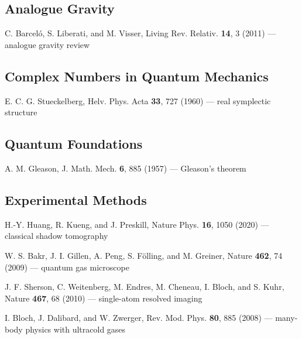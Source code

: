 \documentclass[11pt,a4paper]{article}
\begin{document}
\subsection*{Analogue Gravity}
\begin{enumerate}[leftmargin=*,resume,label={[D\arabic*]}]
\item C. Barcel\'o, S. Liberati, and M. Visser, Living Rev. Relativ. \textbf{14}, 3 (2011) --- analogue gravity review
\end{enumerate}

\subsection*{Complex Numbers in Quantum Mechanics}
\begin{enumerate}[leftmargin=*,resume,label={[D\arabic*]}]
\item E. C. G. Stueckelberg, Helv. Phys. Acta \textbf{33}, 727 (1960) --- real symplectic structure
\end{enumerate}

\subsection*{Quantum Foundations}
\begin{enumerate}[leftmargin=*,resume,label={[D\arabic*]}]
\item A. M. Gleason, J. Math. Mech. \textbf{6}, 885 (1957) --- Gleason's theorem
\end{enumerate}

\subsection*{Experimental Methods}
\begin{enumerate}[leftmargin=*,resume,label={[D\arabic*]}]
\item H.-Y. Huang, R. Kueng, and J. Preskill, Nature Phys. \textbf{16}, 1050 (2020) --- classical shadow tomography
\item W. S. Bakr, J. I. Gillen, A. Peng, S. F\"olling, and M. Greiner, Nature \textbf{462}, 74 (2009) --- quantum gas microscope
\item J. F. Sherson, C. Weitenberg, M. Endres, M. Cheneau, I. Bloch, and S. Kuhr, Nature \textbf{467}, 68 (2010) --- single-atom resolved imaging
\item I. Bloch, J. Dalibard, and W. Zwerger, Rev. Mod. Phys. \textbf{80}, 885 (2008) --- many-body physics with ultracold gases
\end{enumerate}
\end{document}
